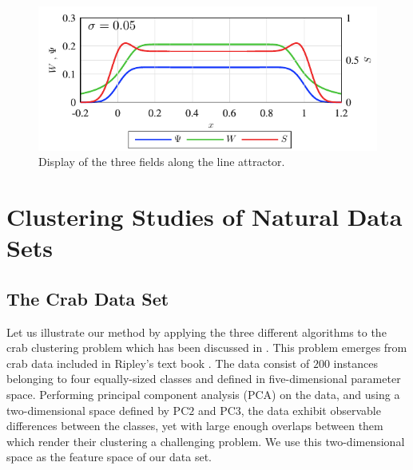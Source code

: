 \documentclass[preprint,12pt]{elsarticle}
\begin{document}
\begin{figure}[t]
\centering
\includegraphics[width=0.6\linewidth]{fig2.pdf}
\caption{Display of the three fields along the line attractor.}
\label{line_attractor_fig}
\end{figure}


















\section{Clustering Studies of Natural Data Sets}
\label{natural}

























\subsection{The Crab Data Set}
\label{crabs}
Let us illustrate our method by applying the three different algorithms to the crab clustering problem which has been discussed in \cite{ben2001,horn2001}. This problem emerges from crab data included in Ripley's text book \cite{ripley1996}. The data consist of $200$ instances belonging to four equally-sized classes and defined in five-dimensional parameter space. Performing principal component analysis (PCA) \cite{jolliffe1986} on the data, and using a two-dimensional space defined by $\textrm{PC2}$ and $\textrm{PC3}$, the data exhibit observable differences between the classes, yet with large enough overlaps between them which render their clustering a challenging problem. We use this two-dimensional space as the feature space of our data set.
\end{document}
